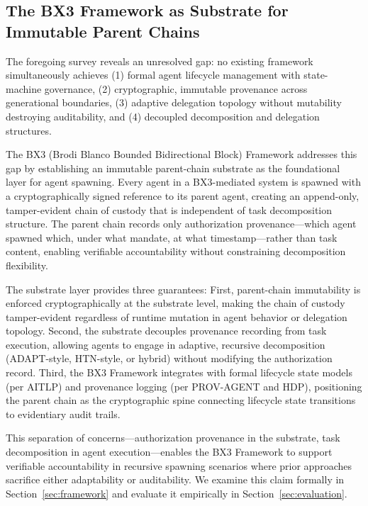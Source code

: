 \subsection{The BX3 Framework as Substrate for Immutable Parent Chains}

The foregoing survey reveals an unresolved gap: no existing framework simultaneously achieves (1) formal agent lifecycle management with state-machine governance, (2) cryptographic, immutable provenance across generational boundaries, (3) adaptive delegation topology without mutability destroying auditability, and (4) decoupled decomposition and delegation structures.

The BX3 (Brodi Blanco Bounded Bidirectional Block) Framework addresses this gap by establishing an immutable parent-chain substrate as the foundational layer for agent spawning. Every agent in a BX3-mediated system is spawned with a cryptographically signed reference to its parent agent, creating an append-only, tamper-evident chain of custody that is independent of task decomposition structure. The parent chain records only authorization provenance---which agent spawned which, under what mandate, at what timestamp---rather than task content, enabling verifiable accountability without constraining decomposition flexibility.

The substrate layer provides three guarantees: First, parent-chain immutability is enforced cryptographically at the substrate level, making the chain of custody tamper-evident regardless of runtime mutation in agent behavior or delegation topology. Second, the substrate decouples provenance recording from task execution, allowing agents to engage in adaptive, recursive decomposition (ADAPT-style, HTN-style, or hybrid) without modifying the authorization record. Third, the BX3 Framework integrates with formal lifecycle state models (per AITLP) and provenance logging (per PROV-AGENT and HDP), positioning the parent chain as the cryptographic spine connecting lifecycle state transitions to evidentiary audit trails.

This separation of concerns---authorization provenance in the substrate, task decomposition in agent execution---enables the BX3 Framework to support verifiable accountability in recursive spawning scenarios where prior approaches sacrifice either adaptability or auditability. We examine this claim formally in Section~\ref{sec:framework} and evaluate it empirically in Section~\ref{sec:evaluation}.



